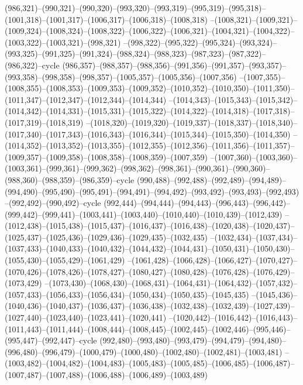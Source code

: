 (986,321)--(990,321)--(990,320)--(993,320)--(993,319)--(995,319)--(995,318)--(1001,318)--(1001,317)--(1006,317)--(1006,318)--(1008,318)
--(1008,321)--(1009,321)--(1009,324)--(1008,324)--(1008,322)--(1006,322)--(1006,321)--(1004,321)--(1004,322)--(1003,322)--(1003,321)--(998,321)
--(998,322)--(995,322)--(995,324)--(993,324)--(993,325)--(991,325)--(991,324)--(988,324)--(988,323)--(987,323)--(987,322)--(986,322)--cycle
(986,357)--(988,357)--(988,356)--(991,356)--(991,357)--(993,357)--(993,358)--(998,358)--(998,357)--(1005,357)--(1005,356)--(1007,356)
--(1007,355)--(1008,355)--(1008,353)--(1009,353)--(1009,352)--(1010,352)--(1010,350)--(1011,350)--(1011,347)--(1012,347)--(1012,344)--(1014,344)
--(1014,343)--(1015,343)--(1015,342)--(1014,342)--(1014,331)--(1015,331)--(1015,322)--(1014,322)--(1014,318)--(1017,318)--(1017,319)--(1018,319)
--(1018,320)--(1019,320)--(1019,337)--(1018,337)--(1018,340)--(1017,340)--(1017,343)--(1016,343)--(1016,344)--(1015,344)--(1015,350)--(1014,350)
--(1014,352)--(1013,352)--(1013,355)--(1012,355)--(1012,356)--(1011,356)--(1011,357)--(1009,357)--(1009,358)--(1008,358)--(1008,359)--(1007,359)
--(1007,360)--(1003,360)--(1003,361)--(999,361)--(999,362)--(998,362)--(998,361)--(990,361)--(990,360)--(988,360)--(988,359)--(986,359)--cycle
(990,488)--(992,488)--(992,489)--(994,489)--(994,490)--(995,490)--(995,491)--(994,491)--(994,492)--(993,492)--(993,493)--(992,493)
--(992,492)--(990,492)--cycle
(992,444)--(994,444)--(994,443)--(996,443)--(996,442)--(999,442)--(999,441)--(1003,441)--(1003,440)--(1010,440)--(1010,439)--(1012,439)
--(1012,438)--(1015,438)--(1015,437)--(1016,437)--(1016,438)--(1020,438)--(1020,437)--(1025,437)--(1025,436)--(1029,436)--(1029,435)--(1032,435)
--(1032,434)--(1037,434)--(1037,433)--(1040,433)--(1040,432)--(1044,432)--(1044,431)--(1050,431)--(1050,430)--(1055,430)--(1055,429)--(1061,429)
--(1061,428)--(1066,428)--(1066,427)--(1070,427)--(1070,426)--(1078,426)--(1078,427)--(1080,427)--(1080,428)--(1076,428)--(1076,429)--(1073,429)
--(1073,430)--(1068,430)--(1068,431)--(1064,431)--(1064,432)--(1057,432)--(1057,433)--(1056,433)--(1056,434)--(1050,434)--(1050,435)--(1045,435)
--(1045,436)--(1040,436)--(1040,437)--(1036,437)--(1036,438)--(1032,438)--(1032,439)--(1027,439)--(1027,440)--(1023,440)--(1023,441)--(1020,441)
--(1020,442)--(1016,442)--(1016,443)--(1011,443)--(1011,444)--(1008,444)--(1008,445)--(1002,445)--(1002,446)--(995,446)--(995,447)--(992,447)--cycle
(992,480)--(993,480)--(993,479)--(994,479)--(994,480)--(996,480)--(996,479)--(1000,479)--(1000,480)--(1002,480)--(1002,481)--(1003,481)
--(1003,482)--(1004,482)--(1004,483)--(1005,483)--(1005,485)--(1006,485)--(1006,487)--(1007,487)--(1007,488)--(1006,488)--(1006,489)--(1003,489)
